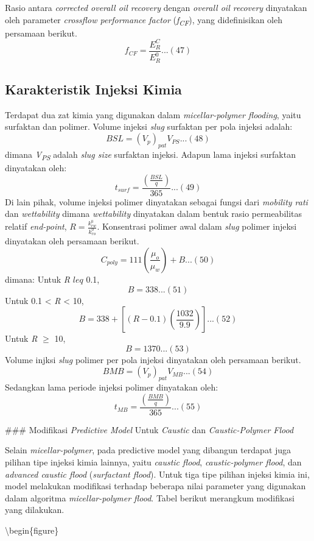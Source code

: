 \documentclass[
]{book}
\begin{document}
Rasio antara \emph{corrected overall oil recovery} dengan \emph{overall oil recovery} dinyatakan oleh parameter \emph{crossflow performance factor} (\emph{f\textsubscript{CF}}), yang didefinisikan oleh persamaan berikut.
\[f_{CF} = \frac{E_R^C}{E_R^0}...(47)\]

\hypertarget{karakteristik-injeksi-kimia}{%
\subsection{Karakteristik Injeksi Kimia}\label{karakteristik-injeksi-kimia}}

Terdapat dua zat kimia yang digunakan dalam \emph{micellar-polymer flooding}, yaitu surfaktan dan polimer. Volume injeksi \emph{slug} surfaktan per pola injeksi adalah:
\[BSL = (V_p)_{pat}V_{PS}...(48)\]
dimana \emph{V\textsubscript{PS}} adalah \emph{slug size} surfaktan injeksi. Adapun lama injeksi surfaktan dinyatakan oleh:
\[t_{surf} = \frac{\left( \frac{BSL}{q} \right)}{365}...(49)\]
Di lain pihak, volume injeksi polimer dinyatakan sebagai fungsi dari \emph{mobility rati} dan
\emph{wettability} dimana \emph{wettability} dinyatakan dalam bentuk rasio permeabilitas relatif \emph{end-point}, \(R=\frac{k_{rw}^0}{k_{ro}^0}\). Konsentrasi polimer awal dalam \emph{slug} polimer injeksi dinyatakan oleh persamaan berikut.
\[C_{poly}=111 \left( \frac{\mu_o}{\mu_w} \right)+B ...(50)\]
dimana:
Untuk \emph{R} \(leq\) 0.1,
\[B = 338...(51)\]
Untuk 0.1 \textless{} \emph{R} \textless{} 10,
\[B = 338 + \left[ (R-0.1) \left( \frac{1032}{9.9} \right)\right]...(52)\]
Untuk \emph{R} \(\geq\) 10,
\[B = 1370 ...(53)\]
Volume injksi \emph{slug}
polimer per pola injeksi dinyatakan oleh persamaan berikut.
\[BMB = (V_p)_{pat}V_{MB}...(54)\]
Sedangkan lama periode injeksi polimer dinyatakan oleh:
\[t_{MB}= \frac{\left( \frac{BMB}{q} \right)}{365}...(55)\]

\#\#\# Modifikasi \emph{Predictive Model} Untuk \emph{Caustic} dan \emph{Caustic-Polymer Flood}

Selain \emph{micellar-polymer}, pada predictive model yang dibangun terdapat juga pilihan tipe injeksi kimia lainnya, yaitu \emph{caustic flood}, \emph{caustic-polymer flood}, dan \emph{advanced caustic flood} (\emph{surfactant flood}). Untuk tiga tipe pilihan injeksi kimia ini, model melakukan modifikasi terhadap beberapa nilai parameter yang digunakan dalam algoritma \emph{micellar-polymer flood}. Tabel berikut merangkum modifikasi yang dilakukan.

\textbackslash begin\{figure\}
\end{document}
